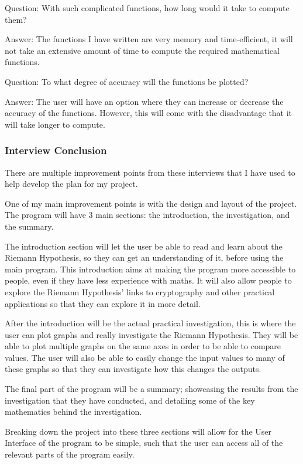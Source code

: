 \documentclass{article}
\begin{document}
Question: With such complicated functions, how long would it take to compute them?

Answer: The functions I have written are very memory and time-efficient, it will not take an extensive amount of time to compute the required mathematical functions.

Question: To what degree of accuracy will the functions be plotted?

Answer: The user will have an option where they can increase or decrease the accuracy of the functions. However, this will come with the disadvantage that it will take longer to compute.

\subsubsection{Interview Conclusion}
There are multiple improvement points from these interviews that I have used to help develop the plan for my project.

One of my main improvement points is with the design and layout of the project. The program will have 3 main sections: the introduction, the investigation, and the summary.

The introduction section will let the user be able to read and learn about the Riemann Hypothesis, so they can get an understanding of it, before using the main program. This introduction aims at making the program more accessible to people, even if they have less experience with maths. It will also allow people to explore the Riemann Hypothesis’ links to cryptography and other practical applications so that they can explore it in more detail.

After the introduction will be the actual practical investigation, this is where the user can plot graphs and really investigate the Riemann Hypothesis. They will be able to plot multiple graphs on the same axes in order to be able to compare values. The user will also be able to easily change the input values to many of these graphs so that they can investigate how this changes the outputs.

The final part of the program will be a summary; showcasing the results from the investigation that they have conducted, and detailing some of the key mathematics behind the investigation.

Breaking down the project into these three sections will allow for the User Interface of the program to be simple, such that the user can access all of the relevant parts of the program easily.
\end{document}
